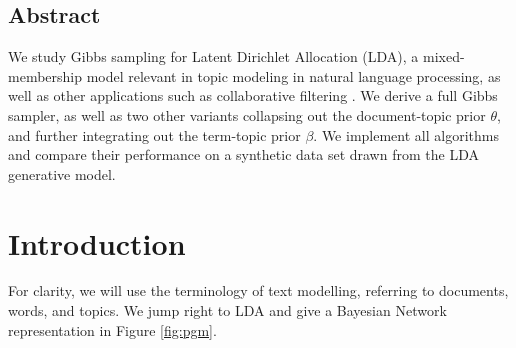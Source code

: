 \documentclass[a0,portrait]{a0poster}
\begin{document}

\begin{multicols}{2} %




\subsection*{Abstract}

\large{
We study Gibbs sampling for Latent Dirichlet Allocation (LDA), a mixed-membership model relevant in topic modeling in natural language processing, as well as other applications such as collaborative filtering \cite{blei2003lda,griffiths2004collapsed}. We derive a full Gibbs sampler, as well as two other variants collapsing out the document-topic prior $\theta$, and further integrating out the term-topic prior $\beta$. We implement all algorithms and compare their performance on a synthetic data set drawn from the LDA generative model. 
}



\section*{Introduction}

\large{
For clarity, we will use the terminology of text modelling, referring to documents, words, and topics. We jump right to LDA and give a Bayesian Network representation in Figure \ref{fig:pgm}.

}



\end{multicols}
\end{document}
